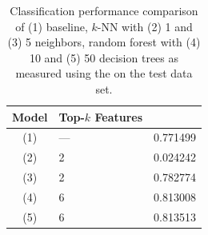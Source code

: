 \begin{table}[t]
  \caption{Classification performance comparison of (1) baseline, $k$-NN with
    (2) 1 and (3) 5 neighbors, random forest with (4) 10 and (5) 50 decision
    trees as measured using the \fmeasure{} on the test data set.}
  \begin{tabularx}{\linewidth}{@{\kern3pt}cCc@{\kern3pt}}
    \toprule
    \bfseries Model & \bfseries Top-$k$ Features & \bfseries \fmeasure{} \\
    \midrule
    (1) & --- & 0.771499 \\
    (2) &   2 & 0.024242 \\
    (3) &   2 & 0.782774 \\
    (4) &   6 & 0.813008 \\
    (5) &   6 & 0.813513 \\
    \bottomrule
  \end{tabularx}
\label{tab:clsperf}
\end{table}

